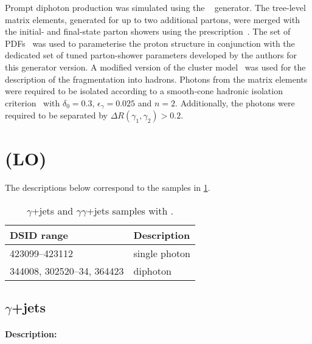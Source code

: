 Prompt diphoton production was simulated using the \SHERPA[2.1]~\cite{Bothmann:2019yzt}
generator. The tree-level matrix elements, generated for up to two
additional partons, were merged with the initial- and final-state parton showers using the
\MEPSatLO prescription~\cite{Hoeche:2009rj}. The \CT[10nlo] set of PDFs~\cite{Lai:2010vv} was
used to parameterise the proton structure in conjunction with the dedicated set of tuned
parton-shower parameters developed by the \SHERPA authors for this generator version. A
modified version of the cluster model~\cite{Winter:2003tt} was used
for the description of the fragmentation into hadrons. Photons from the matrix elements were
required to be isolated according to a smooth-cone hadronic isolation criterion~\cite{Frixione:1998jh}
with $\delta_0=0.3$, $\epsilon_{\gamma}=0.025$ and $n=2$. Additionally, the photons were 
required to be separated by $\Delta R(\gamma_1,\gamma_2) > 0.2$.


\section[Pythia (LO)]{\PYTHIA (LO)}

The descriptions below correspond to the samples in \cref{tab:gammajets-pythia-lo}.

\begin{table}[!htbp]
  \caption{$\gamma$+jets and  $\gamma\gamma$+jets samples with \PYTHIA.}%
  \label{tab:gammajets-pythia-lo}
  \centering
  \begin{tabular}{l l}
    \toprule
    DSID range & Description \\
    \midrule
    423099--423112 & single photon \\
    344008, 302520--34, 364423 & diphoton \\
    \bottomrule
  \end{tabular}
\end{table}


\subsection[y+jets]{$\gamma$+jets}

\paragraph{Description:}

